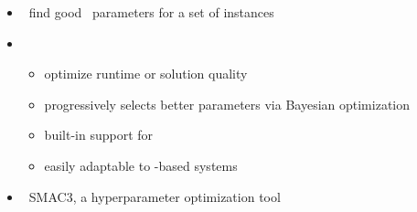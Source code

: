 \begin{frame}{\acclingo}
  \begin{itemize}
    \item {} \ find good \clingo\ parameters for a set of instances
    \item {} \
      \begin{itemize}
        \item optimize runtime or solution quality
        \item progressively selects better parameters via Bayesian optimization
        \item built-in support for \clingo
        \item easily adaptable to \clingo-based systems
      \end{itemize}
    \item {} \ SMAC3, a hyperparameter optimization tool
    \end{itemize}
  \end{frame}
%

